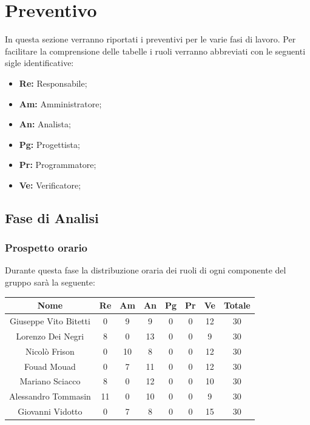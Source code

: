 \section{Preventivo}
	In questa sezione verranno riportati i preventivi per le varie fasi di lavoro. Per facilitare la comprensione delle tabelle i ruoli verranno abbreviati con le seguenti sigle identificative:
			\begin{itemize}
			\item\textbf{Re:} Responsabile;
			\item\textbf{Am:} Amministratore;
			\item\textbf{An:} Analista;
			\item\textbf{Pg:} Progettista;
			\item\textbf{Pr:} Programmatore;
			\item\textbf{Ve:} Verificatore;
		\end{itemize}
	\subsection{Fase di Analisi}
		\subsubsection{Prospetto orario}
			Durante questa fase la distribuzione oraria dei ruoli di ogni componente del gruppo sarà la seguente:
			
			\begin{longtable}{|c|c|c|c|c|c|c|c}
				\hline
				\rowcolor{lighter-grayer}
				\textbf{Nome} & \textbf{Re} & \textbf{Am} & \textbf{An} & \textbf{Pg}  & \textbf{Pr}   & \textbf{Ve} & \textbf{Totale} \\
				\hline
				\endfirsthead
				
				\hline
				Giuseppe Vito Bitetti & 0 & 9 & 9 & 0 & 0 & 12 & 30\\
				\hline
				\hline
				Lorenzo Dei Negri & 8 & 0 & 13 & 0 & 0 & 9 & 30\\
				\hline
				\hline
				Nicolò Frison & 0 & 10 & 8 & 0 & 0 & 12 & 30\\
				\hline
				\hline
				Fouad Mouad & 0 & 7 & 11 & 0 & 0 & 12 & 30\\
				\hline
				\hline
				Mariano Sciacco & 8 & 0 & 12 & 0 & 0 & 10 & 30\\
				\hline
				\hline
				Alessandro Tommasin & 11 & 0 & 10 & 0 & 0 & 9 & 30\\
				\hline
				\hline
				Giovanni Vidotto & 0 & 7 & 8 & 0 & 0 & 15 & 30\\
				\hline 

			\end{longtable}
			\pagebreak
		
